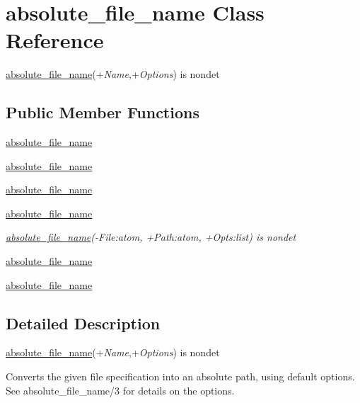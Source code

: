 \section{absolute\+\_\+file\+\_\+name Class Reference}
\label{classabsolute__file__name}


\hyperlink{classabsolute__file__name}{absolute\+\_\+file\+\_\+name}(+{\itshape Name},+{\itshape Options}) is nondet  


\subsection*{Public Member Functions}
\begin{DoxyCompactItemize}
\item 
\hyperlink{classabsolute__file__name_a130783f28246faf494c45aea5961893f}{absolute\+\_\+file\+\_\+name}
\item 
\hyperlink{classabsolute__file__name_a130783f28246faf494c45aea5961893f}{absolute\+\_\+file\+\_\+name}
\item 
\hyperlink{classabsolute__file__name_a130783f28246faf494c45aea5961893f}{absolute\+\_\+file\+\_\+name}
\item 
\hyperlink{classabsolute__file__name_a130783f28246faf494c45aea5961893f}{absolute\+\_\+file\+\_\+name}
\begin{DoxyCompactList}\small\item\em \hyperlink{classabsolute__file__name}{absolute\+\_\+file\+\_\+name}(-\/\+File\+:atom, +\+Path\+:atom, +\+Opts\+:list) is nondet \end{DoxyCompactList}\item 
\hyperlink{classabsolute__file__name_a130783f28246faf494c45aea5961893f}{absolute\+\_\+file\+\_\+name}
\item 
\hyperlink{classabsolute__file__name_a130783f28246faf494c45aea5961893f}{absolute\+\_\+file\+\_\+name}
\end{DoxyCompactItemize}


\subsection{Detailed Description}
\hyperlink{classabsolute__file__name}{absolute\+\_\+file\+\_\+name}(+{\itshape Name},+{\itshape Options}) is nondet 

Converts the given file specification into an absolute path, using default options. See absolute\+\_\+file\+\_\+name/3 for details on the options. 


